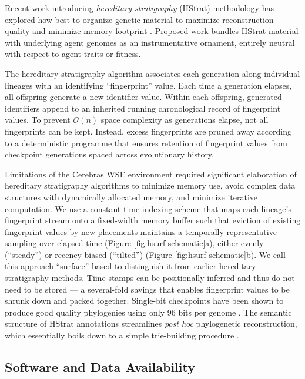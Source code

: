 Recent work introducing \textit{hereditary stratigraphy} (HStrat) methodology has explored how best to organize genetic material to maximize reconstruction quality and minimize memory footprint \citep{moreno2022hstrat, moreno2022hereditary}.
Proposed work bundles HStrat material with underlying agent genomes as an instrumentative ornament, entirely neutral with respect to agent traits or fitness.

The hereditary stratigraphy algorithm associates each generation along individual lineages with an identifying ``fingerprint'' value.
Each time a generation elapses, all offspring generate a new identifier value.
Within each offspring, generated identifiers append to an inherited running chronological record of fingerprint values.
To prevent $\mathcal{O}(n)$ space complexity as generations elapse, not all fingerprints can be kept.
Instead, excess fingerprints are pruned away according to a deterministic programme that ensures retention of fingerprint values from checkpoint generations spaced across evolutionary history.

Limitations of the Cerebras WSE environment required significant elaboration of hereditary stratigraphy algorithms to minimize memory use, avoid complex data structures with dynamically allocated memory, and minimize iterative computation.
We use a constant-time indexing scheme that maps each lineage's fingerprint stream onto a fixed-width memory buffer such that eviction of existing fingerprint values by new placements maintains a temporally-representative sampling over elapsed time (Figure \ref{fig:hsurf-schematic}a), either evenly (``steady'') or recency-biased (``tilted'') (Figure \ref{fig:hsurf-schematic}b).
We call this approach ``surface''-based to distinguish it from earlier hereditary stratigraphy methods.
Time stamps can be positionally inferred and thus do not need to be stored --- a several-fold savings that enables fingerprint values to be shrunk down and packed together.
Single-bit checkpoints have been shown to produce good quality phylogenies using only 96 bits per genome \citep{moreno2023toward}.
The semantic structure of HStrat annotations streamlines \textit{post hoc} phylogenetic reconstruction, which essentially boils down to a simple trie-building procedure
\citep{moreno2024analysis}.

\subsection{Software and Data Availability}

